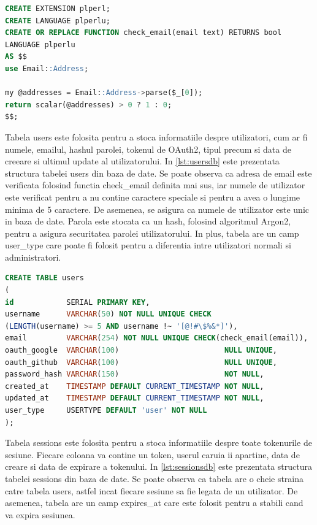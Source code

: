 \documentclass[titlepage,12pt]{article}
\DeclareRobustCommand{\code}[1]{{\ttfamily\small #1}}
\begin{document}
\begin{lstlisting}[language=SQL,caption={Functia PL/perl pentru verificarea adresei de email},label={lst:emailcheckplperl}]
CREATE EXTENSION plperl;
CREATE LANGUAGE plperlu;
CREATE OR REPLACE FUNCTION check_email(email text) RETURNS bool
LANGUAGE plperlu
AS $$
use Email::Address;

my @addresses = Email::Address->parse($_[0]);
return scalar(@addresses) > 0 ? 1 : 0;
$$;
\end{lstlisting}

Tabela \code{users} este folosita pentru a stoca informatiile despre utilizatori, cum ar fi numele, emailul, hashul parolei, tokenul de \code{OAuth2}, tipul precum si data de creeare si ultimul update al utilizatorului. In \cref{lst:usersdb} este prezentata structura tabelei \code{users} din baza de date.
Se poate observa ca adresa de email este verificata folosind functia \code{check\_email} definita mai sus, iar numele de utilizator este verificat pentru a nu contine caractere speciale si pentru a avea o lungime minima de 5 caractere. De asemenea, se asigura ca numele de utilizator este unic in baza de date. Parola este stocata ca un hash, folosind algoritmul \code{Argon2}, pentru a asigura securitatea parolei utilizatorului. In plus, tabela are un camp \code{user\_type} care poate fi folosit pentru a diferentia intre utilizatori normali si administratori.
\begin{lstlisting}[language=SQL,caption={Tabelele \code{users} din baza de date},label={lst:usersdb}]
CREATE TABLE users
(
id            SERIAL PRIMARY KEY,
username      VARCHAR(50) NOT NULL UNIQUE CHECK
(LENGTH(username) >= 5 AND username !~ '[@!#\$%&*]'),
email         VARCHAR(254) NOT NULL UNIQUE CHECK(check_email(email)),
oauth_google  VARCHAR(100)                        NULL UNIQUE,
oauth_github  VARCHAR(100)                        NULL UNIQUE,
password_hash VARCHAR(150)                        NOT NULL,
created_at    TIMESTAMP DEFAULT CURRENT_TIMESTAMP NOT NULL,
updated_at    TIMESTAMP DEFAULT CURRENT_TIMESTAMP NOT NULL,
user_type     USERTYPE DEFAULT 'user' NOT NULL
);
\end{lstlisting}

Tabela \code{sessions} este folosita pentru a stoca informatiile despre toate tokenurile de sesiune. Fiecare coloana va contine un token, userul caruia ii apartine, data de creare si data de expirare a tokenului. In \cref{lst:sessionsdb} este prezentata structura tabelei \code{sessions} din baza de date.
Se poate observa ca tabela are o cheie straina catre tabela \code{users}, astfel incat fiecare sesiune sa fie legata de un utilizator. De asemenea, tabela are un camp \code{expires\_at} care este folosit pentru a stabili cand va expira sesiunea.
\end{document}
